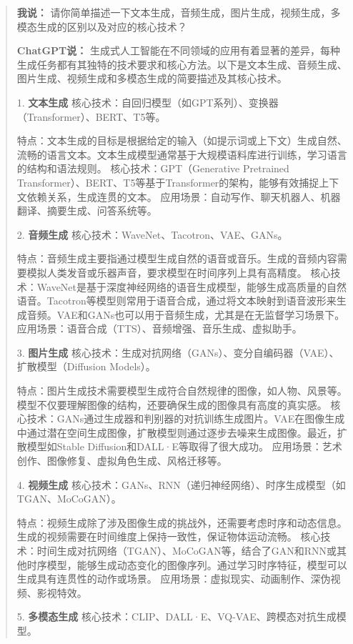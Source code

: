 \begin{quote}
\textbf{我说：} 请你简单描述一下文本生成，音频生成，图片生成，视频生成，多模态生成的区别以及对应的核心技术？

\textbf{ChatGPT说：}  
生成式人工智能在不同领域的应用有着显著的差异，每种生成任务都有其独特的技术要求和核心方法。以下是文本生成、音频生成、图片生成、视频生成和多模态生成的简要描述及其核心技术。

1. \textbf{文本生成}  
核心技术：自回归模型（如GPT系列）、变换器（Transformer）、BERT、T5等。

特点：文本生成的目标是根据给定的输入（如提示词或上下文）生成自然、流畅的语言文本。文本生成模型通常基于大规模语料库进行训练，学习语言的结构和语法规则。  
核心技术：GPT（Generative Pretrained Transformer）、BERT、T5等基于Transformer的架构，能够有效捕捉上下文依赖关系，生成连贯的文本。  
应用场景：自动写作、聊天机器人、机器翻译、摘要生成、问答系统等。

2. \textbf{音频生成}  
核心技术：WaveNet、Tacotron、VAE、GANs。

特点：音频生成主要指通过模型生成自然的语音或音乐。生成的音频内容需要模拟人类发音或乐器声音，要求模型在时间序列上具有高精度。  
核心技术：WaveNet是基于深度神经网络的语音生成模型，能够生成高质量的自然语音。Tacotron等模型则常用于语音合成，通过将文本映射到语音波形来生成音频。VAE和GANs也可以用于音频生成，尤其是在无监督学习场景下。  
应用场景：语音合成（TTS）、音频增强、音乐生成、虚拟助手。

3. \textbf{图片生成}  
核心技术：生成对抗网络（GANs）、变分自编码器（VAE）、扩散模型（Diffusion Models）。

特点：图片生成技术需要模型生成符合自然规律的图像，如人物、风景等。模型不仅要理解图像的结构，还要确保生成的图像具有高度的真实感。  
核心技术：GANs通过生成器和判别器的对抗训练生成图片。VAE在图像生成中通过潜在空间生成图像，扩散模型则通过逐步去噪来生成图像。最近，扩散模型如Stable Diffusion和DALL·E等取得了很大成功。  
应用场景：艺术创作、图像修复、虚拟角色生成、风格迁移等。

4. \textbf{视频生成}  
核心技术：GANs、RNN（递归神经网络）、时序生成模型（如TGAN、MoCoGAN）。

特点：视频生成除了涉及图像生成的挑战外，还需要考虑时序和动态信息。生成的视频需要在时间维度上保持一致性，保证物体运动流畅。  
核心技术：时间生成对抗网络（TGAN）、MoCoGAN等，结合了GAN和RNN或其他时序模型，能够生成动态变化的图像序列。通过学习时序特征，模型可以生成具有连贯性的动作或场景。  
应用场景：虚拟现实、动画制作、深伪视频、影视特效。

5. \textbf{多模态生成}  
核心技术：CLIP、DALL·E、VQ-VAE、跨模态对抗生成模型。


\end{quote}
